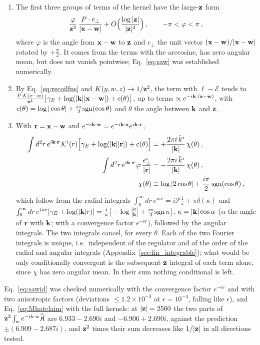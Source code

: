 \begin{enumerate}
\item The first three groups of terms of the kernel have the large-$\mathbf{z}$ form
\begin{align}\label{eq:saw}
\frac{\varphi}{\mathbf{z}^2}\,\frac{P\cdot e_\perp}{|\mathbf{x}-\mathbf{w}|}+O\Big(\frac{\log|\mathbf{z}|}{|\mathbf{z}|^3}\Big)\,,\qquad-\pi<\varphi<\pi\,,
\end{align}
where $\varphi$ is the angle from $\mathbf{x}-\mathbf{w}$ to $\mathbf{z}$ and $e_\perp$ the unit vector $(\mathbf{x}-\mathbf{w})/|\mathbf{x}-\mathbf{w}|$ rotated by $+\frac\pi2$. It comes from the terms with the arccosine, has zero angular mean, but does not vanish pointwise; Eq.~\eqref{eq:saw} was established numerically.
\item By Eq.~\eqref{eq:recoilfns} and $K(y,w,z)\to1/\mathbf{z}^2$, the term with $\ell-\mathcal E$ tends to $\frac{P\cdot\mathcal{K}(x-w)}{\mathbf{z}^2}\big[\gamma_E+\log(|\mathbf{k}||\mathbf{x}-\mathbf{w}|)+c(\theta)\big]$, up to terms $\propto e^{-i\mathbf{k}\cdot(\mathbf{z}-\mathbf{w})}$, with $c(\theta)=\log|\cos\theta|+\frac{i\pi}{2}{\rm sgn}(\cos\theta)$ and $\theta$ the angle between $\mathbf{k}$ and $\mathbf{z}$.
\item With $\mathbf{r}=\mathbf{x}-\mathbf{w}$ and $e^{-i\mathbf{k}\cdot\mathbf{w}}=e^{-i\mathbf{k}\cdot\mathbf{x}}e^{i\mathbf{k}\cdot\mathbf{r}}$,
\begin{align}\label{eq:sawid}
\int d^2r\,e^{i\mathbf{k}\cdot\mathbf{r}}\,\mathcal{K}^i(r)\Big[\gamma_E+\log(|\mathbf{k}||\mathbf{r}|)+c(\theta)\Big]&=+\frac{2\pi i\,\hat k^i}{|\mathbf{k}|}\,\chi(\theta)\,,\notag\\
\int d^2r\,e^{i\mathbf{k}\cdot\mathbf{r}}\,\varphi\,\frac{e_\perp^i}{|\mathbf{r}|}&=-\frac{2\pi i\,\hat k^i}{|\mathbf{k}|}\,\chi(\theta)\,,\notag\\
\chi(\theta)&\equiv\log|2\cos\theta|+\frac{i\pi}{2}\,{\rm sgn}(\cos\theta)\,,
\end{align}
which follow from the radial integrals $\int_0^\infty dr\,e^{i\kappa r}=i\mathcal P\frac1\kappa+\pi\delta(\kappa)$ and $\int_0^\infty dr\,e^{i\kappa r}[\gamma_E+\log(|\mathbf{k}|r)]=\frac{i}{\kappa}\big[-\log\frac{|\kappa|}{|\mathbf{k}|}+\frac{i\pi}{2}{\rm sgn}\,\kappa\big]$, $\kappa=|\mathbf{k}|\cos\alpha$ ($\alpha$ the angle of $\mathbf{r}$ with $\mathbf{k}$; with a convergence factor $e^{-\epsilon r}$), followed by the angular integrals. The two integrals cancel, for every $\theta$. Each of the two Fourier integrals is unique, i.e.\ independent of the regulator and of the order of the radial and angular integrals (Appendix~\ref{sec:fin_integrable}); what would be only conditionally convergent is the subsequent $\mathbf{z}$ integral of each term alone, since $\chi$ has zero angular mean. In their sum nothing conditional is left.
\end{enumerate}
Eq.~\eqref{eq:sawid} was checked numerically with the convergence factor $e^{-\epsilon r}$ and with two anisotropic factors (deviations $\le1.2\times10^{-3}$ at $\epsilon=10^{-4}$, falling like $\epsilon$), and Eq.~\eqref{eq:Mhatclaim} with the full kernels: at $|\mathbf{z}|=2560$ the two parts of $\mathbf{z}^2\int_we^{-ik\cdot w}\widehat{\mathfrak K}$ are $6.933-2.690i$ and $-6.906+2.690i$, against the prediction $\pm(6.909-2.687i)$, and $\mathbf{z}^2$ times their sum decreases like $1/|\mathbf{z}|$ in all directions tested.

